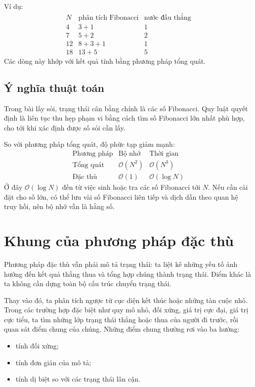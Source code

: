\documentclass[11pt]{article}
\newcommand{\Oh}{\mathcal{O}}
\begin{document}
Ví dụ:
\[
\begin{array}{c|c|c}
N & \text{phân tích Fibonacci} & \text{nước đầu thắng}\\ \hline
4 & 3+1 & 1\\
7 & 5+2 & 2\\
12 & 8+3+1 & 1\\
18 & 13+5 & 5
\end{array}
\]
Các dòng này khớp với kết quả tính bằng phương pháp tổng quát.

\subsection{Ý nghĩa thuật toán}

Trong bài lấy sỏi, trạng thái cân bằng chính là các số Fibonacci. Quy luật
quyết định là liên tục thu hẹp phạm vi bằng cách tìm số Fibonacci lớn nhất
phù hợp, cho tới khi xác định được số sỏi cần lấy.

So với phương pháp tổng quát, độ phức tạp giảm mạnh:
\[
\begin{array}{c|c|c}
\text{Phương pháp} & \text{Bộ nhớ} & \text{Thời gian}\\ \hline
\text{Tổng quát} & \Oh(N^2) & \Oh(N^3)\\
\text{Đặc thù} & \Oh(1) & \Oh(\log N)
\end{array}
\]
Ở đây \(\Oh(\log N)\) đến từ việc sinh hoặc tra các số Fibonacci tới \(N\).
Nếu cần cài đặt cho số lớn, có thể lưu vài số Fibonacci liên tiếp và dịch dần
theo quan hệ truy hồi, nên bộ nhớ vẫn là hằng số.

\section{Khung của phương pháp đặc thù}

Phương pháp đặc thù vẫn phải mô tả trạng thái: ta liệt kê những yếu tố ảnh
hưởng đến kết quả thắng thua và tổng hợp chúng thành trạng thái. Điểm khác
là ta không cần dựng toàn bộ cấu trúc chuyển trạng thái.

Thay vào đó, ta phân tích ngược từ cục diện kết thúc hoặc những tàn cuộc nhỏ.
Trong các trường hợp đặc biệt như quy mô nhỏ, đối xứng, giá trị cực đại, giá
trị cực tiểu, ta tìm những lớp trạng thái thắng hoặc thua của người đi trước,
rồi quan sát điểm chung của chúng. Những điểm chung thường rơi vào ba hướng:
\begin{itemize}
  \item tính đối xứng;
  \item tính đơn giản của mô tả;
  \item tính dị biệt so với các trạng thái lân cận.
\end{itemize}
\end{document}
